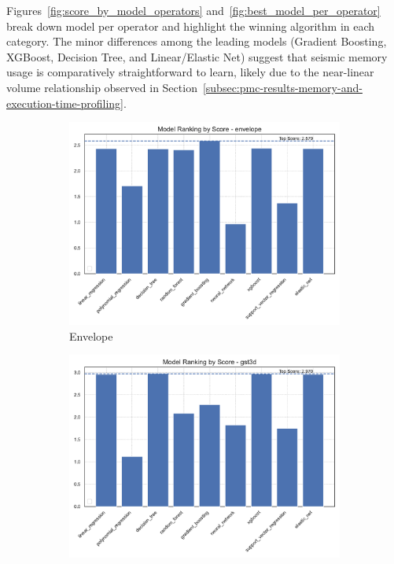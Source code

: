 Figures~\ref{fig:score_by_model_operators} and~\ref{fig:best_model_per_operator} break down model  per operator and highlight the winning algorithm in each category.
The minor differences among the leading models (Gradient Boosting, XGBoost, Decision Tree, and Linear/Elastic Net) suggest that seismic memory usage is comparatively straightforward to learn, likely due to the near-linear volume relationship observed in Section~\ref{subsec:pmc-results-memory-and-execution-time-profiling}.

\begin{figure}[htbp]
    \centering
    \begin{subfigure}[t]{0.32\textwidth}
        \includegraphics[width=\textwidth]{assets/images/05/score_by_model_envelope}
        \caption{Envelope}
    \end{subfigure}
    \hfill
    \begin{subfigure}[t]{0.32\textwidth}
        \includegraphics[width=\textwidth]{assets/images/05/score_by_model_gst3d}

\end{subfigure}
\end{figure}
